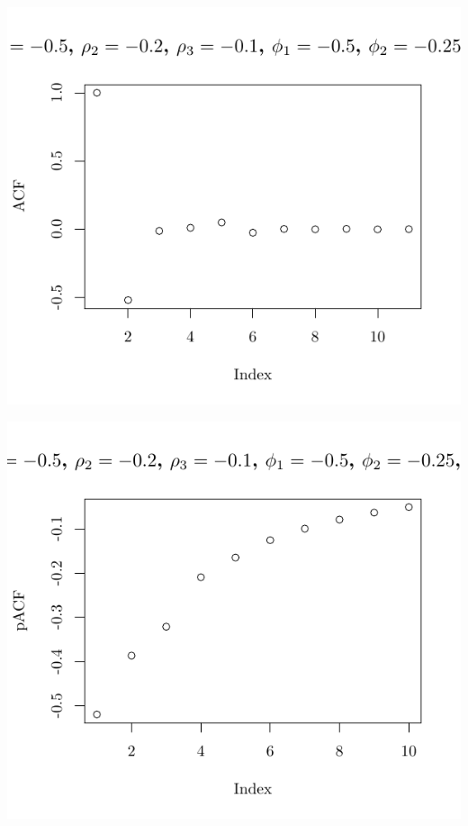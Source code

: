 \documentclass[10pt]{paper}\usepackage[]{graphicx}\usepackage[]{color}
\makeatletter
\def\maxwidth{ %
  \ifdim\Gin@nat@width>\linewidth
    \linewidth
  \else
    \Gin@nat@width
  \fi
}
\newenvironment{knitrout}{}{} %
\makeatother
\begin{document}
\begin{knitrout}
{\centering \includegraphics[width=\maxwidth]{figure/graphics-plotter-145} 

}




{\centering \includegraphics[width=\maxwidth]{figure/graphics-plotter-146} 

}





\end{knitrout}
\end{document}
